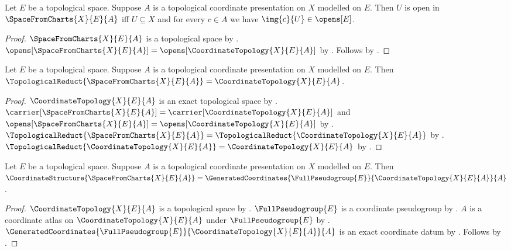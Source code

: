 \begin{theorem}\label{space_from_charts_open_iff}
    Let $E$ be a topological space.
    Suppose $A$ is a topological coordinate presentation on $X$ modelled on $E$.
    Then $U$ is open in $\SpaceFromCharts{X}{E}{A}$ iff
        $U\subseteq X$ and for every $c\in A$ we have $\img{c}{U}\in\opens[E]$.
\end{theorem}
\begin{proof}
    $\SpaceFromCharts{X}{E}{A}$ is a topological space by
        .
    $\opens[\SpaceFromCharts{X}{E}{A}]=\opens[\CoordinateTopology{X}{E}{A}]$ by
        .
    Follows by .
\end{proof}

\begin{theorem}\label{space_from_charts_topological_reduct}
    Let $E$ be a topological space.
    Suppose $A$ is a topological coordinate presentation on $X$ modelled on $E$.
    Then $\TopologicalReduct{\SpaceFromCharts{X}{E}{A}}=\CoordinateTopology{X}{E}{A}$.
\end{theorem}
\begin{proof}
    $\CoordinateTopology{X}{E}{A}$ is an exact topological space by
        .
    $\carrier[\SpaceFromCharts{X}{E}{A}]=\carrier[\CoordinateTopology{X}{E}{A}]$ and
        $\opens[\SpaceFromCharts{X}{E}{A}]=\opens[\CoordinateTopology{X}{E}{A}]$ by
        .
    $\TopologicalReduct{\SpaceFromCharts{X}{E}{A}}=\TopologicalReduct{\CoordinateTopology{X}{E}{A}}$ by
        .
    $\TopologicalReduct{\CoordinateTopology{X}{E}{A}}=\CoordinateTopology{X}{E}{A}$ by
        .
\end{proof}

\begin{theorem}\label{space_from_charts_coordinate_structure}
    Let $E$ be a topological space.
    Suppose $A$ is a topological coordinate presentation on $X$ modelled on $E$.
    Then $\CoordinateStructure{\SpaceFromCharts{X}{E}{A}}
        =\GeneratedCoordinates{\FullPseudogroup{E}}{\CoordinateTopology{X}{E}{A}}{A}$.
\end{theorem}
\begin{proof}
    $\CoordinateTopology{X}{E}{A}$ is a topological space by .
    $\FullPseudogroup{E}$ is a coordinate pseudogroup by .
    $A$ is a coordinate atlas on $\CoordinateTopology{X}{E}{A}$ under $\FullPseudogroup{E}$ by
        .
    $\GeneratedCoordinates{\FullPseudogroup{E}}{\CoordinateTopology{X}{E}{A}}{A}$ is an exact coordinate datum by
        .
    Follows by .
\end{proof}


